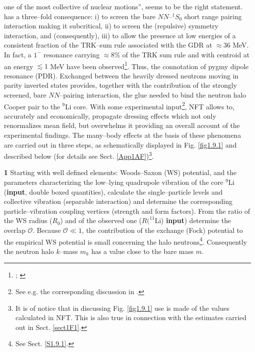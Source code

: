 { one of the most collective of nuclear  motions'', seems to be  the right statement.} has a three--fold consequence: i) to screen the bare $NN$--$^1S_0$ short  range pairing interaction making it subcritical, ii) to screen the (repulsive) symmetry interaction, and (consequently), iii) to allow the presence at low energies of a consistent fraction of the TRK--sum rule associated with the GDR at $\approx 36$ MeV. In fact, a $1^-$ resonance carrying $\approx 8\%$ of the TRK sum rule and with centroid at an energy $\lesssim 1$ MeV have been observed\footnote{\cite{Kanungo:15}; \cite{Sackett:93,Zinser:97}}. Thus, the connotation of pygmy dipole  resonance (PDR). Exchanged between the heavily dressed neutrons moving in  parity inverted states provides, together with the contribution of the strongly screened, bare $NN$--pairing interaction, the glue needed to bind the neutron halo Cooper pair to the $^9$Li core. With some experimental input\footnote{See e.g. the corresponding discussion in \cite{Barranco:17}.}, NFT allows to, accurately and economically, propagate dressing effects which not only renormalizes mean field, but overwhelms it providing an overall account of the experimental findings.
The many--body effects at the basis of these phenomena are carried out   in three steps, as schematically displayed in Fig. \ref{fig1.9.1} and described below (for details see Sect. \ref{App1AF})\footnote{It is of notice that in discussing Fig. \ref{fig1.9.1} use is made of the values calculated in NFT. This is also true in connection with the estimates carried out in Sect. \ref{sect1F1}.}.


\textbf{1} Starting with well defined elements: Woods--Saxon (WS) potential, and the parameters characterizing the low--lying quadrupole vibration of the core $^{9}$Li (\textbf{input}, double boxed quantities), calculate the single--particle levels and collective vibration (separable interaction) and determine the corresponding particle--vibration coupling vertices (strength and form factors). From the ratio of the WS radius ($R_0$) and of the observed one ($R(^{11}$Li) \textbf{input}) determine the overlap $\mathcal O$. Because $\mathcal O\ll 1$, the contribution of the exchange (Fock) potential to the empirical WS potential is small concerning the halo neutrons\footnote{See Sect. \ref{S1.9.1}.}. Consequently the neutron halo $k$--mass $m_k$ has a value close to the bare mass $m$.

